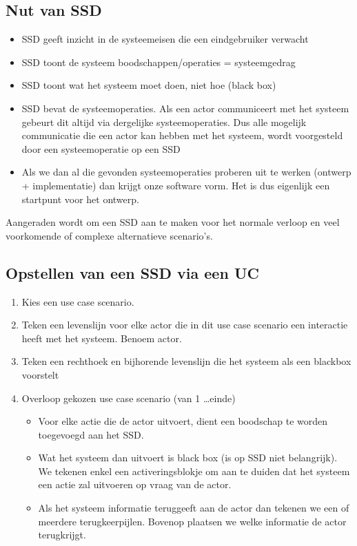 \subsection{Nut van SSD}
\begin{itemize}
	\item SSD geeft inzicht in de systeemeisen die een eindgebruiker verwacht
	\item SSD toont de systeem boodschappen/operaties = systeemgedrag
	\item SSD toont wat het systeem moet doen, niet hoe (black box)
	\item SSD bevat de systeemoperaties. Als een actor communiceert met het systeem gebeurt dit altijd via dergelijke systeemoperaties. Dus alle mogelijk communicatie die een actor kan hebben met het systeem, wordt voorgesteld door een systeemoperatie op een SSD
	\item Als we dan al die gevonden systeemoperaties proberen uit te werken (ontwerp + implementatie) dan krijgt onze software vorm. Het is dus eigenlijk een startpunt voor het ontwerp.
\end{itemize}

Aangeraden wordt om een SSD aan te maken voor het normale verloop en veel voorkomende of complexe alternatieve scenario's.

\subsection{Opstellen van een SSD via een UC}
\begin{enumerate}
	\item Kies een use case scenario. 
	\item Teken een levenslijn voor elke actor die in dit use case scenario een interactie heeft met het systeem. Benoem actor.
	\item Teken een rechthoek en bijhorende levenslijn die het systeem als een blackbox voorstelt
	\item Overloop gekozen use case scenario (van 1 \dots einde)
\begin{itemize}
	\item Voor elke actie die de actor uitvoert, dient een boodschap te worden toegevoegd aan het SSD. 
	\item Wat het systeem dan uitvoert is black box (is op SSD niet belangrijk). We tekenen enkel een activeringsblokje om aan te duiden dat het systeem een actie zal uitvoeren op vraag van de actor. 
	\item Als het systeem informatie teruggeeft aan de actor dan tekenen we een of meerdere terugkeerpijlen. Bovenop plaatsen we welke informatie de actor terugkrijgt.
\end{itemize}
\end{enumerate}

